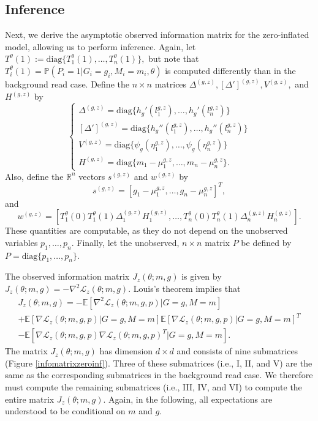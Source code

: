 \documentclass[12pt]{article}
\begin{document}
\begin{appendices}
\begin{refsection}
		\subsection{Inference}
		Next, we derive the asymptotic observed information matrix for the zero-inflated model, allowing us to perform inference. Again, let $T^{\theta}(1) := \textrm{diag}\{T^{\theta}_1(1), \dots, T^{\theta}_n(1)\},$ but note that $T^\theta_i(1) = \mathbb{P}(P_i = 1 | G_i = g_i, M_i = m_i, \theta)$ is computed differently than in the background read case. Define the $n \times n$ matrices $\Delta^{(g,z)}, [\Delta']^{(g,z)}, V^{(g,z)},$ and $H^{(g,z)}$ by
		$$
		\begin{cases}
		\Delta^{(g,z)} = \textrm{diag} \{ h_g'(l_1^{g,z} ), \dots, h_g'( l_n^{g,z}  ) \} \\
		[\Delta']^{(g,z)}  = \textrm{diag} \{ h_g''(l_1^{g,z} ), \dots, h_g''( l_n^{g,z} ) \} \\
		V^{(g,z)}  = \textrm{diag} \{ \psi_g( \eta^{g,z} _1), \dots, \psi_g( \eta^{g,z}_n) \} \\
		H^{(g,z)}  = \textrm{diag} \{ m_1 - \mu_1^{g,z} , \dots, m_n - \mu_n^{g,z} \} .
		\end{cases}
		$$
		Also, define the $\mathbb{R}^n$ vectors $s^{(g,z)}$ and $w^{(g,z)}$ by
		$$s^{(g,z)} = [g_1 - \mu_1^{g,z}, \dots, g_n - \mu_n^{g,z}]^T,$$ and $$w^{(g,z)} = [T^\theta_1(0)T^\theta_1(1) \Delta_1^{(g,z)}H^{(g,z)}_1,\dots, T^\theta_n(0)T^\theta_n(1) \Delta_n^{(g,z)}H^{(g,z)}_n].$$ These quantities are computable, as they do not depend on the unobserved variables $p_1, \dots, p_n$. Finally, let the unobserved, $n\times n$ matrix $P$ be defined by $P = \textrm{diag}\{ p_1, \dots, p_n \}$.
		
		
		The observed information matrix $J_z(\theta; m, g)$ is given by
		$J_z(\theta; m, g) = -\nabla^2 \mathcal{L}_z(\theta; m, g).$ Louis's theorem implies that
		\begin{multline*}
		J_z(\theta; m, g) = -\mathbb{E} \left[\nabla^2 \mathcal{L}_z(\theta; m, g, p) | G = g, M = m \right] \\ + \mathbb{E}\left[\nabla \mathcal{L}_z(\theta; m, g, p) | G = g, M = m \right] \mathbb{E}\left[\nabla \mathcal{L}_z(\theta; m, g, p) | G = g, M = m \right]^T \\ - \mathbb{E}\left[\nabla\mathcal{L}_z(\theta; m, g, p) \nabla \mathcal{L}_z(\theta; m, g, p)^T | G = g, M = m \right].
		\end{multline*}
		The matrix $J_z(\theta; m, g)$ has dimension $d \times d$ and consists of nine submatrices (Figure \ref{infomatrixzeroinf}). Three of these submatrices (i.e., I, II, and V) are the same as the corresponding submatrices in the background read case. We therefore must compute the remaining submatrices (i.e., III, IV, and VI) to compute the entire matrix $J_z(\theta; m, g)$. Again, in the following, all expectations are understood to be conditional on $m$ and $g$.
		

\end{refsection}
\end{appendices}
\end{document}
